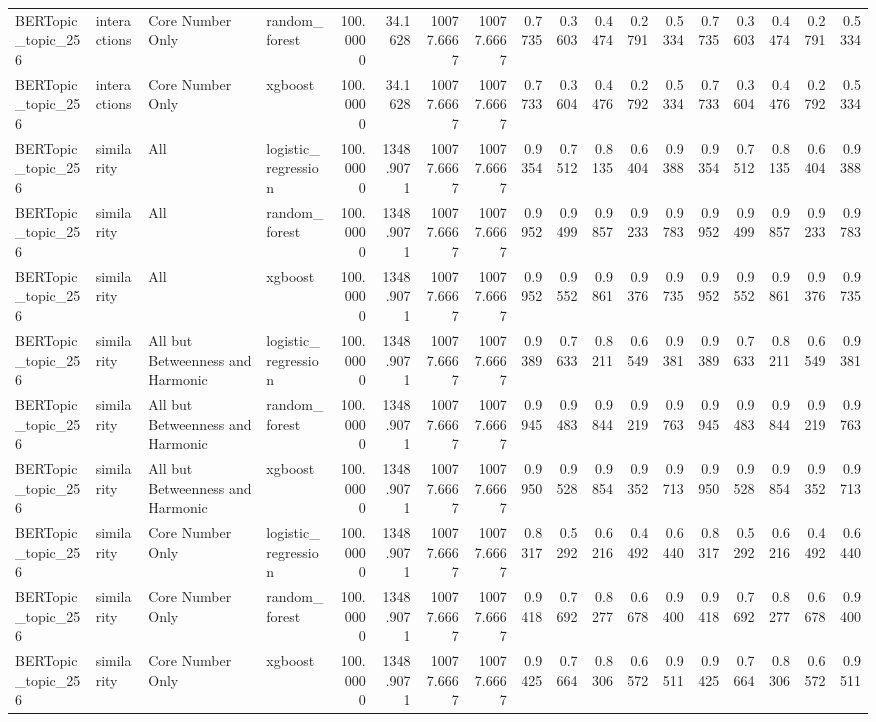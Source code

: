 \begin{tabular}{llllrrrrrrrrrrrrrr}
BERTopic_topic_256 & interactions & Core Number Only & random_forest & 100.0000 & 34.1628 & 10077.6667 & 10077.6667 & 0.7735 & 0.3603 & 0.4474 & 0.2791 & 0.5334 & 0.7735 & 0.3603 & 0.4474 & 0.2791 & 0.5334 \\
BERTopic_topic_256 & interactions & Core Number Only & xgboost & 100.0000 & 34.1628 & 10077.6667 & 10077.6667 & 0.7733 & 0.3604 & 0.4476 & 0.2792 & 0.5334 & 0.7733 & 0.3604 & 0.4476 & 0.2792 & 0.5334 \\
BERTopic_topic_256 & similarity & All & logistic_regression & 100.0000 & 1348.9071 & 10077.6667 & 10077.6667 & 0.9354 & 0.7512 & 0.8135 & 0.6404 & 0.9388 & 0.9354 & 0.7512 & 0.8135 & 0.6404 & 0.9388 \\
BERTopic_topic_256 & similarity & All & random_forest & 100.0000 & 1348.9071 & 10077.6667 & 10077.6667 & 0.9952 & 0.9499 & 0.9857 & 0.9233 & 0.9783 & 0.9952 & 0.9499 & 0.9857 & 0.9233 & 0.9783 \\
BERTopic_topic_256 & similarity & All & xgboost & 100.0000 & 1348.9071 & 10077.6667 & 10077.6667 & 0.9952 & 0.9552 & 0.9861 & 0.9376 & 0.9735 & 0.9952 & 0.9552 & 0.9861 & 0.9376 & 0.9735 \\
BERTopic_topic_256 & similarity & All but Betweenness and Harmonic & logistic_regression & 100.0000 & 1348.9071 & 10077.6667 & 10077.6667 & 0.9389 & 0.7633 & 0.8211 & 0.6549 & 0.9381 & 0.9389 & 0.7633 & 0.8211 & 0.6549 & 0.9381 \\
BERTopic_topic_256 & similarity & All but Betweenness and Harmonic & random_forest & 100.0000 & 1348.9071 & 10077.6667 & 10077.6667 & 0.9945 & 0.9483 & 0.9844 & 0.9219 & 0.9763 & 0.9945 & 0.9483 & 0.9844 & 0.9219 & 0.9763 \\
BERTopic_topic_256 & similarity & All but Betweenness and Harmonic & xgboost & 100.0000 & 1348.9071 & 10077.6667 & 10077.6667 & 0.9950 & 0.9528 & 0.9854 & 0.9352 & 0.9713 & 0.9950 & 0.9528 & 0.9854 & 0.9352 & 0.9713 \\
BERTopic_topic_256 & similarity & Core Number Only & logistic_regression & 100.0000 & 1348.9071 & 10077.6667 & 10077.6667 & 0.8317 & 0.5292 & 0.6216 & 0.4492 & 0.6440 & 0.8317 & 0.5292 & 0.6216 & 0.4492 & 0.6440 \\
BERTopic_topic_256 & similarity & Core Number Only & random_forest & 100.0000 & 1348.9071 & 10077.6667 & 10077.6667 & 0.9418 & 0.7692 & 0.8277 & 0.6678 & 0.9400 & 0.9418 & 0.7692 & 0.8277 & 0.6678 & 0.9400 \\
BERTopic_topic_256 & similarity & Core Number Only & xgboost & 100.0000 & 1348.9071 & 10077.6667 & 10077.6667 & 0.9425 & 0.7664 & 0.8306 & 0.6572 & 0.9511 & 0.9425 & 0.7664 & 0.8306 & 0.6572 & 0.9511 \\

\end{tabular}
